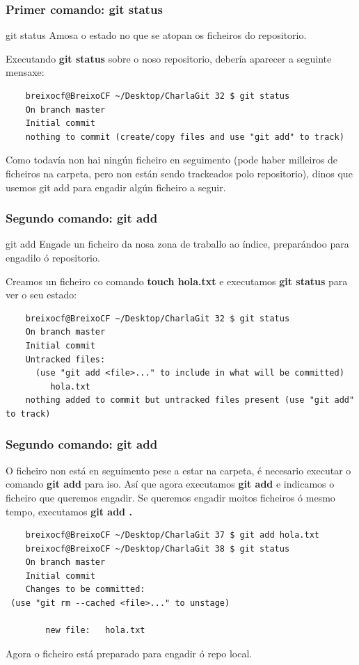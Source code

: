 \begin{frame}[fragile]
  \frametitle{Primer comando: git status}
  \begin{block}{git status}
    Amosa o estado no que se atopan os ficheiros do repositorio.
  \end{block}
  Executando \textbf{git status} sobre o noso repositorio, debería aparecer a seguinte mensaxe:
  \tiny
\begin{verbatim}
	breixocf@BreixoCF ~/Desktop/CharlaGit 32 $ git status
	On branch master
	Initial commit
	nothing to commit (create/copy files and use "git add" to track)
\end{verbatim}
  \small Como todavía non hai ningún ficheiro en seguimento (pode haber milleiros de ficheiros na carpeta, pero non están sendo trackeados polo repositorio), dinos que usemos git add para engadir algún ficheiro a seguir.
\end{frame}

\begin{frame}[fragile]
  \frametitle{Segundo comando: git add}
  \begin{block}{git add}
    Engade un ficheiro da nosa zona de traballo ao índice, preparándoo para
    engadilo ó repositorio.
  \end{block}
  \small
  Creamos un ficheiro co comando \textbf{touch hola.txt} e executamos \textbf{git status} para ver o seu estado:
  \tiny
\begin{verbatim}
	breixocf@BreixoCF ~/Desktop/CharlaGit 32 $ git status
	On branch master
	Initial commit
	Untracked files:
	  (use "git add <file>..." to include in what will be committed)
	     hola.txt
	nothing added to commit but untracked files present (use "git add" to track)
\end{verbatim}
\end{frame}

\begin{frame}[fragile]
  \frametitle{Segundo comando: git add}
  O ficheiro non está en seguimento pese a estar na carpeta, é necesario executar o comando \textbf{git add} para iso. Así que agora executamos \textbf{git add} e indicamos o ficheiro que queremos engadir. Se queremos engadir moitos ficheiros ó mesmo tempo, executamos \textbf{git add .}
  \tiny 
\begin{verbatim}
	breixocf@BreixoCF ~/Desktop/CharlaGit 37 $ git add hola.txt 
	breixocf@BreixoCF ~/Desktop/CharlaGit 38 $ git status
	On branch master
	Initial commit
	Changes to be committed:
 (use "git rm --cached <file>..." to unstage)
	
		new file:   hola.txt
\end{verbatim}
  \small
  Agora o ficheiro está preparado para engadir ó repo local.
\end{frame}

